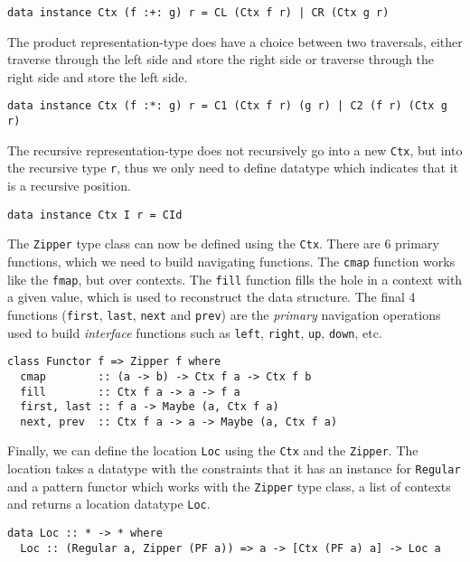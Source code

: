 \begin{verbatim}
data instance Ctx (f :+: g) r = CL (Ctx f r) | CR (Ctx g r)
\end{verbatim}

The product representation-type does have a choice between two traversals, either traverse through the left side and store the right side or traverse through the right side and store the left side.

\begin{verbatim}
data instance Ctx (f :*: g) r = C1 (Ctx f r) (g r) | C2 (f r) (Ctx g r)
\end{verbatim}

The recursive representation-type does not recursively go into a new \texttt{Ctx}, but into the recursive type \texttt{r}, thus we only need to define datatype which indicates that it is a recursive position.

\begin{verbatim}
data instance Ctx I r = CId
\end{verbatim}

The \texttt{Zipper} type class can now be defined using the \texttt{Ctx}. There are 6 primary functions, which we need to build navigating functions. The \texttt{cmap} function works like the \texttt{fmap}, but over contexts. The \texttt{fill} function fills the hole in a context with a given value, which is used to reconstruct the data structure. The final 4 functions (\texttt{first}, \texttt{last}, \texttt{next} and \texttt{prev}) are the \textit{primary} navigation operations used to build \textit{interface} functions such as \texttt{left}, \texttt{right}, \texttt{up}, \texttt{down}, etc.

\begin{verbatim}
class Functor f => Zipper f where
  cmap        :: (a -> b) -> Ctx f a -> Ctx f b
  fill        :: Ctx f a -> a -> f a
  first, last :: f a -> Maybe (a, Ctx f a)
  next, prev  :: Ctx f a -> a -> Maybe (a, Ctx f a)
\end{verbatim}

Finally, we can define the location \texttt{Loc} using the \texttt{Ctx} and the \texttt{Zipper}. The location takes a datatype with the constraints that it has an instance for \texttt{Regular} and a pattern functor which works with the \texttt{Zipper} type class, a list of contexts and returns a location datatype \texttt{Loc}.

\begin{verbatim}
data Loc :: * -> * where
  Loc :: (Regular a, Zipper (PF a)) => a -> [Ctx (PF a) a] -> Loc a
\end{verbatim}

